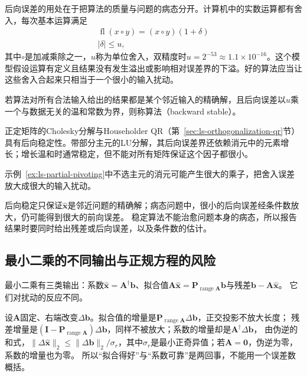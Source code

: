 后向误差的用处在于把算法的质量与问题的病态分开。计算机中的实数运算都有舍入，每次基本运算满足
\begin{equation}
\begin{gathered}
\operatorname{fl}(x\circ y)=(x\circ y)(1+\delta)\\
|\delta|\leq u,
\end{gathered}
\label{eq:ch06-floating-point-model}
\end{equation}
其中$\circ$是加减乘除之一，$u$称为单位舍入，双精度时$u=2^{-53}\approx1.1\times10^{-16}$。这个模型假设运算有定义且结果没有发生溢出或影响相对误差界的下溢。好的算法应当让这些舍入合起来只相当于一个很小的输入扰动。

\begin{definition}[后向稳定]
\label{def:matrix-analysis-backward-stability}
若算法对所有合法输入给出的结果都是某个邻近输入的精确解，且后向误差以$u$乘一个与数据无关的温和常数为界，则称算法（backward stable）。
\end{definition}
正定矩阵的Cholesky分解与Householder QR（第~\ref{sec:ls-orthogonalization-qr}节）具有后向稳定性。带部分主元的LU分解，其后向误差界还依赖消元中的元素增长；增长温和时通常稳定，但不能对所有矩阵保证这个因子都很小。

示例~\ref{ex:ls-partial-pivoting}中不选主元的消元可能产生很大的乘子，把舍入误差放大成很大的输入扰动。

后向稳定只保证$\widehat{\bm x}$是邻近问题的精确解；病态问题中，很小的后向误差经条件数放大，仍可能得到很大的前向误差。
稳定算法不能治愈问题本身的病态，所以报告结果时要同时给出残差或后向误差，以及条件数的估计。

\subsection{最小二乘的不同输出与正规方程的风险}
\label{sec:ls-ls-regularization-sensitivity}
\label{sec:ls-ordinary-ls-sensitivity}

最小二乘有三类输出：系数$\hat{\bm x}=\bm A^\dagger\bm b$、拟合值$\bm A\hat{\bm x}=\bm P_{\operatorname{range}\bm A}\bm b$与残差$\bm b-\bm A\hat{\bm x}$。
它们对扰动的反应不同。

设$\bm A$固定、右端改变$\Delta\bm b$。拟合值的增量是$\bm P_{\operatorname{range}\bm A}\Delta\bm b$，正交投影不放大长度；
残差增量是$(\bm I-\bm P_{\operatorname{range}\bm A})\Delta\bm b$，同样不被放大；系数的增量却是$\bm A^\dagger\Delta\bm b$，
由伪逆的和式，$\lVert\Delta\hat{\bm x}\rVert_2\leq\lVert\Delta\bm b\rVert_2/\sigma_r$，其中$\sigma_r$是最小正奇异值；若$\bm A=\bm0$，伪逆为零，系数的增量也为零。
所以“拟合得好”与“系数可靠”是两回事，不能用一个误差数概括。

